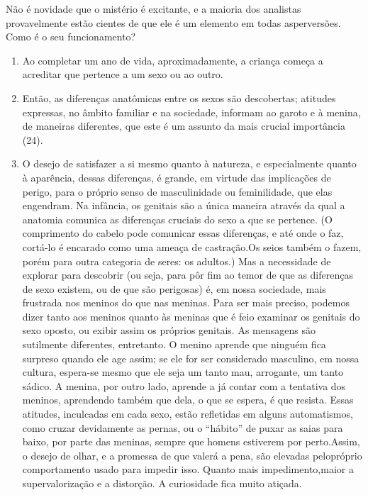 Não é novidade que o mistério é excitante, e a maioria dos analistas
provavelmente estão cientes de que ele é um elemento em todas as\idxconfemeni[|)]
perversões. Como é o seu funcionamento?

\begin{enumerate}
	
\item Ao completar um ano de vida, aproximadamente, a criança começa a
acreditar que pertence a um sexo ou ao outro.

\item Então, as diferenças anatômicas entre os sexos são descobertas;
atitudes expressas, no âmbito familiar e na sociedade, informam ao
garoto e à menina, de maneiras diferentes, que este é um assunto da
mais crucial importância (24).

\item O desejo de satisfazer a si mesmo quanto à natureza, e
especialmente quanto à aparência, dessas diferenças, é grande, em
virtude das implicações de perigo, para o próprio senso de
masculinidade ou feminilidade, que elas engendram. Na infância, os
genitais são a única maneira através da qual a anatomia comunica as
diferenças cruciais do sexo a que se pertence. (O comprimento do cabelo
pode comunicar essas diferenças, e até onde o faz, cortá-lo é encarado
como uma ameaça de castração.\idxcastaconf[|(] Os seios também o fazem, porém para outra
categoria de seres: os adultos.) Mas a necessidade de explorar para
descobrir (ou seja, para pôr fim ao temor de que as diferenças de sexo
existem, ou de que são perigosas) é, em nossa sociedade, mais frustrada
nos meninos do que nas meninas. Para ser mais preciso,\idxinfanexib{} podemos dizer
tanto aos meninos quanto às meninas que é feio examinar os genitais do
sexo oposto, ou exibir assim os próprios genitais.\idxexibiinfa{} As mensagens são
sutilmente diferentes, entretanto. O menino aprende que ninguém fica
surpreso quando ele age assim; se ele for ser considerado masculino, em
nossa cultura, espera-se mesmo que ele seja um tanto mau, arrogante, um
tanto sádico. A menina, por outro lado, aprende a já contar com a
tentativa dos meninos, aprendendo também que dela, o que se espera, é
que resista. Essas atitudes, inculcadas em cada sexo, estão refletidas
em alguns automatismos, como cruzar devidamente as pernas, ou o
``hábito'' de puxar as saias para baixo, por
parte das meninas, sempre que homens estiverem por perto.\idxmist[|)] Assim, o
desejo de olhar,\idxvoy{} e a promessa de que valerá a pena, são elevadas pelo\idxsexueinf[|)]
próprio comportamento usado para impedir isso. Quanto mais impedimento,\idxsexuedif[|)]
maior a supervalorização e a distorção.\idxinfancurio{} A curiosidade\idxgenetgenicuri{} fica muito
atiçada.


\end{enumerate}
